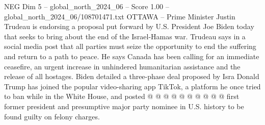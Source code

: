 \begin{textsample}{NEG Dim 5 – global\_north\_2024\_06 – Score 1.00 – global\_north\_2024\_06/108701471.txt}
OTTAWA -- Prime Minister Justin Trudeau is endorsing a proposal put forward by U.S.
President Joe Biden today that seeks to bring about the end of the Israel-Hamas war.
Trudeau says in a social media post that all parties must seize the opportunity to end the suffering and return to a path to peace.
He says Canada has been calling for an immediate ceasefire, an urgent increase in unhindered humanitarian assistance and the release of all hostages.
Biden detailed a three-phase deal proposed by Isra Donald Trump has joined the popular video-sharing app TikTok, a platform he once tried to ban while in the White House, and posted @ @ @ @ @ @ @ @ @ @ first former president and presumptive major party nominee in U.S. history to be found guilty on felony charges.

\end{textsample}
